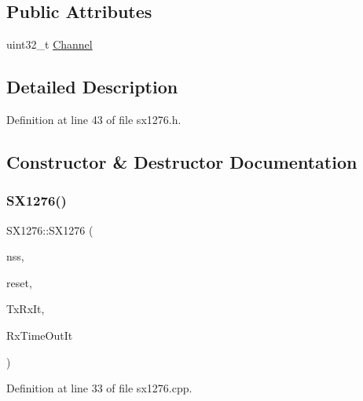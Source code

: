 \subsection*{Public Attributes}
\begin{DoxyCompactItemize}
\item 
uint32\+\_\+t \mbox{\hyperlink{class_s_x1276_aa927ccaaf4ff0cec945f8e9f02171c00}{Channel}}
\end{DoxyCompactItemize}


\subsection{Detailed Description}


Definition at line 43 of file sx1276.\+h.



\subsection{Constructor \& Destructor Documentation}
\mbox{\label{class_s_x1276_a9fd5df20eb50285357e5c5f1dbcbbd4c}} 
\subsubsection{\texorpdfstring{S\+X1276()}{SX1276()}}
{\footnotesize\ttfamily S\+X1276\+::\+S\+X1276 (\begin{DoxyParamCaption}\item[{\mbox{\hyperlink{_class_s_t_m32_l0_8h_a5ceb873075d76667eb54dc6a7d2734d1}{Pin\+Name}}}]{nss,  }\item[{\mbox{\hyperlink{_class_s_t_m32_l0_8h_a5ceb873075d76667eb54dc6a7d2734d1}{Pin\+Name}}}]{reset,  }\item[{\mbox{\hyperlink{_class_s_t_m32_l0_8h_a5ceb873075d76667eb54dc6a7d2734d1}{Pin\+Name}}}]{Tx\+Rx\+It,  }\item[{\mbox{\hyperlink{_class_s_t_m32_l0_8h_a5ceb873075d76667eb54dc6a7d2734d1}{Pin\+Name}}}]{Rx\+Time\+Out\+It }\end{DoxyParamCaption})}



Definition at line 33 of file sx1276.\+cpp.

\mbox{\label{class_s_x1276_a309d7607da2a200cf0a288532540b133}} 
